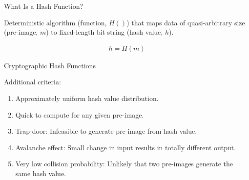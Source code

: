 \documentclass[]{beamer}
\begin{document}
\begin{frame}{What Is a Hash Function?}

Deterministic algorithm (\color{focus}function, $H()$\color{black}) that maps data of quasi-arbitrary size (\color{focus}pre-image, $m$\color{black}) to fixed-length bit string (\color{focus}hash value, $h$\color{black}).

	\begin{align}
		h = H(m)
		\label{eq:hash_function}
	\end{align}

\vspace{1.5em}
	
	
\end{frame}

\begin{frame}{Cryptographic Hash Functions}

Additional criteria:
	\begin{enumerate}
		\item Approximately uniform hash value distribution.
		\item Quick to compute for any given pre-image.
		\item Trap-door: Infeasible to generate pre-image from hash value.
		\item Avalanche effect: Small change in input results in totally different output.
		\item Very low collision probability: Unlikely that two pre-images generate the same hash value.
	\end{enumerate}
	\vspace{1em}

	
\end{frame}
\end{document}

